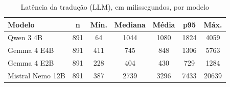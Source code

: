 \begin{table}[htbp!]
\centering
\caption{Latência da tradução (LLM), em milissegundos, por modelo}
\label{tab:latencia}
\small
\begin{tabular}{|l|c|c|c|c|c|c|}
\hline
\textbf{Modelo} & \textbf{n} & \textbf{Mín.} & \textbf{Mediana} & \textbf{Média} & \textbf{p95} & \textbf{Máx.} \\
\hline
Qwen 3 4B & 891 & 64 & 1044 & 1080 & 1824 & 4059 \\
Gemma 4 E4B & 891 & 411 & 745 & 848 & 1306 & 5763 \\
Gemma 4 E2B & 891 & 228 & 404 & 430 & 729 & 1284 \\
Mistral Nemo 12B & 891 & 387 & 2739 & 3296 & 7433 & 20639 \\
\hline
\end{tabular}
\end{table}
